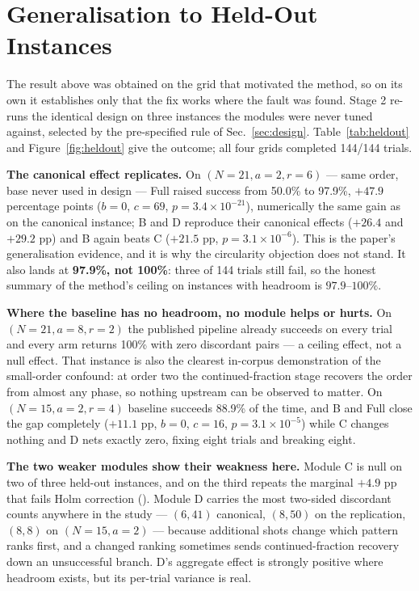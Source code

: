 \section{Generalisation to Held-Out Instances}
\label{sec:heldout}

The result above was obtained on the grid that motivated the method, so
on its own it establishes only that the fix works where the fault was
found. Stage 2 re-runs the identical design on three instances the
modules were never tuned against, selected by the pre-specified rule of
Sec.~\ref{sec:design}. Table~\ref{tab:heldout} and
Figure~\ref{fig:heldout} give the outcome; all four grids completed
144/144 trials.

\textbf{The canonical effect replicates.} On $(N{=}21,a{=}2,r{=}6)$ ---
same order, base never used in design --- Full raised success from 50.0\%
to 97.9\%, $+47.9$ percentage points ($b{=}0$, $c{=}69$,
$p=3.4\times10^{-21}$), numerically the same gain as on the canonical
instance; B and D reproduce their canonical effects ($+26.4$ and
$+29.2$ pp) and B again beats C ($+21.5$ pp, $p=3.1\times10^{-6}$). This
is the paper's generalisation evidence, and it is why the circularity
objection does not stand. It also lands at \textbf{97.9\%, not 100\%}:
three of 144 trials still fail, so the honest summary of the method's
ceiling on instances with headroom is $97.9$--$100\%$.

\textbf{Where the baseline has no headroom, no module helps or hurts.} On
$(N{=}21,a{=}8,r{=}2)$ the published pipeline already succeeds on every
trial and every arm returns 100\% with zero discordant pairs --- a ceiling
effect, not a null effect. That instance is also the clearest in-corpus
demonstration of the small-order confound: at order two the
continued-fraction stage recovers the order from almost any phase, so
nothing upstream can be observed to matter. On $(N{=}15,a{=}2,r{=}4)$
baseline succeeds 88.9\% of the time, and B and Full close the gap
completely ($+11.1$ pp, $b{=}0$, $c{=}16$, $p=3.1\times10^{-5}$) while C
changes nothing and D nets exactly zero, fixing eight trials and breaking
eight.

\textbf{The two weaker modules show their weakness here.} Module C is
null on two of three held-out instances, and on the third repeats the
marginal $+4.9$ pp that fails Holm correction (\SItables{}).
Module D carries the most two-sided discordant counts anywhere in the
study --- $(6,41)$ canonical, $(8,50)$ on the replication, $(8,8)$ on
$(N{=}15,a{=}2)$ --- because additional shots change which pattern ranks
first, and a changed ranking sometimes sends continued-fraction recovery
down an unsuccessful branch. D's aggregate effect is strongly positive
where headroom exists, but its per-trial variance is real.


